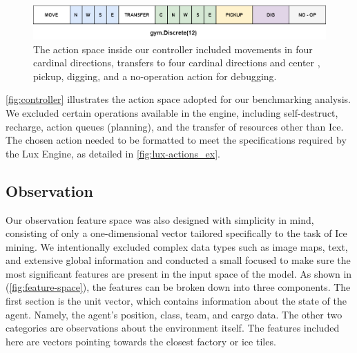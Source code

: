 \begin{figure}[htbp]
    \centering
    \includegraphics[width=1\linewidth]{images/methods_singleunit/action/controller.png}
    \captionsetup{justification=justified, singlelinecheck=false, width=1\linewidth, labelfont=bf} 
    \caption[]{The action space inside our controller included movements in four cardinal directions, transfers to four cardinal directions and center \protect\footnotemark, pickup, digging, and a no-operation action for debugging.}
    \label{fig:controller}
\end{figure}





\noindent \textcolor{deepblue}{\autoref{fig:controller}} illustrates the action space adopted for our benchmarking analysis. We excluded certain operations available in the engine, including self-destruct, recharge, action queues (planning), and the transfer of resources other than Ice. The chosen action needed to be formatted to meet the specifications required by the Lux Engine, as detailed in \textcolor{deepblue}{\autoref{fig:lux-actions_ex}}.

\subsection{Observation}
\label{subsec:single-observation}

\noindent Our observation feature space was also designed with simplicity in mind, consisting of only a one-dimensional vector tailored specifically to the task of Ice mining. We intentionally excluded complex data types such as image maps, text, and extensive global information and conducted a small focused  to make sure the most significant features are present in the input space of the model. As shown in (\textcolor{deepblue}{\autoref{fig:feature-space}}), the features can be broken down into three components. The first section is the unit vector, which contains information about the state of the agent. Namely, the agent's position, class, team, and cargo data. The other two categories are observations about the environment itself. The features included here are vectors pointing towards the closest factory or ice tiles.

